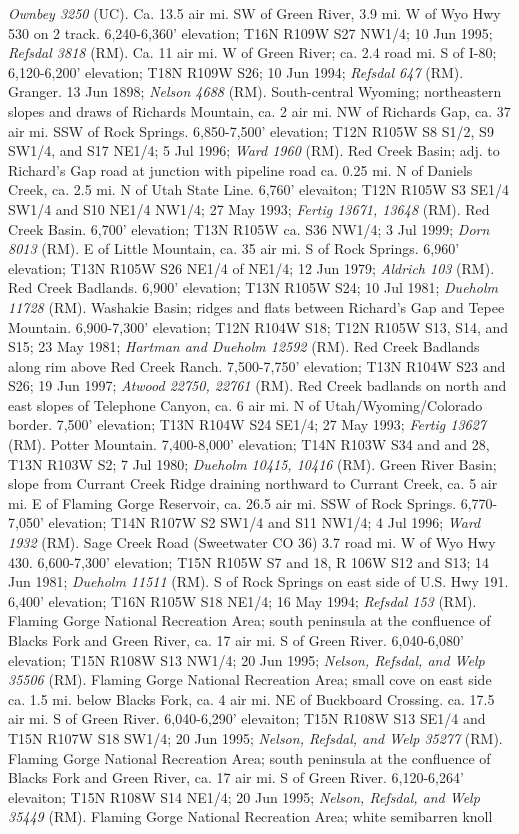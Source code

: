 \textit{Ownbey 3250} (UC).  Ca. 13.5 air mi. SW of Green River, 3.9 mi. W of Wyo Hwy 530 on 2 track. 6,240-6,360' elevation; T16N R109W S27 NW1/4; 10 Jun 1995; \textit{Refsdal 3818} (RM).  Ca. 11 air mi. W of Green River; ca. 2.4 road mi. S of I-80; 6,120-6,200' elevation; T18N R109W S26; 10 Jun 1994; \textit{Refsdal 647} (RM).  Granger. 13 Jun 1898; \textit{Nelson 4688} (RM).  South-central Wyoming; northeastern slopes and draws of Richards Mountain, ca. 2 air mi. NW of Richards Gap, ca. 37 air mi. SSW of Rock Springs. 6,850-7,500' elevation; T12N R105W S8 S1/2, S9 SW1/4, and S17 NE1/4; 5 Jul 1996; \textit{Ward 1960} (RM).  Red Creek Basin; adj. to Richard's Gap road at junction with pipeline road ca. 0.25 mi. N of Daniels Creek, ca. 2.5 mi. N of Utah State Line. 6,760' elevaiton; T12N R105W S3 SE1/4 SW1/4 and S10 NE1/4 NW1/4;	27 May 1993; \textit{Fertig 13671, 13648} (RM).  Red Creek Basin. 6,700' elevation; T13N R105W ca. S36 NW1/4; 3 Jul 1999; \textit{Dorn 8013} (RM).  E of Little Mountain, ca. 35 air mi. S of Rock Springs. 6,960' elevation; T13N R105W S26 NE1/4 of NE1/4; 12 Jun 1979; \textit{Aldrich 103} (RM).  Red Creek Badlands. 6,900' elevation; T13N R105W S24; 10 Jul 1981; \textit{Dueholm 11728} (RM).  Washakie Basin; ridges and flats between Richard's Gap and Tepee Mountain. 6,900-7,300' elevation; T12N R104W S18; T12N R105W S13, S14, and S15; 23 May 1981; \textit{Hartman and Dueholm 12592} (RM).  Red Creek Badlands along rim above Red Creek Ranch.	7,500-7,750' elevation; T13N R104W S23 and S26; 19 Jun 1997; \textit{Atwood 22750, 22761} (RM).  Red Creek badlands on north and east slopes of Telephone Canyon, ca. 6 air mi. N of Utah/Wyoming/Colorado border. 7,500' elevation; T13N R104W S24 SE1/4; 27 May 1993; \textit{Fertig 13627} (RM).  Potter Mountain. 7,400-8,000' elevation; T14N R103W S34 and and 28, T13N R103W S2; 7 Jul 1980; \textit{Dueholm 10415, 10416} (RM).  Green River Basin; slope from Currant Creek Ridge draining northward to Currant Creek, ca. 5 air mi. E of Flaming Gorge Reservoir, ca. 26.5 air mi. SSW of Rock Springs. 6,770-7,050' elevation; T14N R107W S2 SW1/4 and S11 NW1/4; 4 Jul 1996; \textit{Ward 1932} (RM).  Sage Creek Road (Sweetwater CO 36) 3.7 road mi. W of Wyo Hwy 430. 6,600-7,300' elevation; T15N R105W S7 and 18, R 106W S12 and S13; 14 Jun 1981; \textit{Dueholm 11511} (RM).  S of Rock Springs on east side of U.S. Hwy 191. 6,400' elevation; T16N R105W S18 NE1/4; 16 May 1994; \textit{Refsdal 153} (RM).  Flaming Gorge National Recreation Area; south peninsula at the confluence of Blacks Fork and Green River, ca. 17 air mi. S of Green River. 6,040-6,080' elevation; T15N R108W S13 NW1/4; 20 Jun 1995; \textit{Nelson, Refsdal, and Welp 35506} (RM).  Flaming Gorge National Recreation Area; small cove on east side ca. 1.5 mi. below Blacks Fork, ca. 4 air mi. NE of Buckboard Crossing. ca. 17.5 air mi. S of Green River. 6,040-6,290' elevaiton; T15N R108W S13 SE1/4 and T15N R107W S18 SW1/4; 20 Jun 1995; \textit{Nelson, Refsdal, and Welp 35277} (RM).  Flaming Gorge National Recreation Area; south peninsula at the confluence of Blacks Fork and Green River, ca. 17 air mi. S of Green River. 6,120-6,264' elevaiton; T15N R108W S14 NE1/4; 20 Jun 1995; \textit{Nelson, Refsdal, and Welp 35449} (RM).  Flaming Gorge National Recreation Area; white semibarren knoll 
